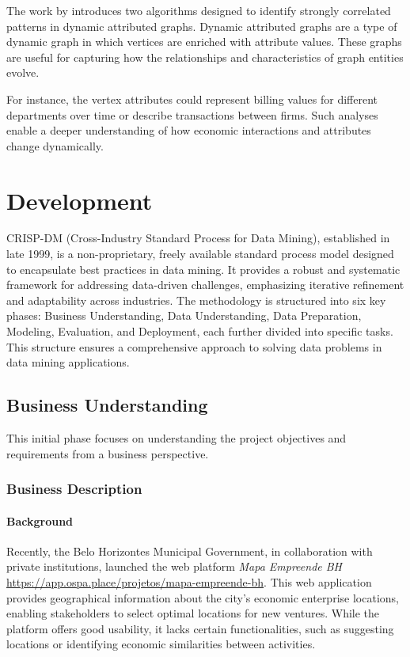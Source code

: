 \documentclass[12pt]{article}
\begin{document}
The work by \cite{fournier2019mining} introduces two algorithms designed to identify strongly correlated patterns in dynamic attributed graphs. Dynamic attributed graphs are a type of dynamic graph in which vertices are enriched with attribute values. These graphs are useful for capturing how the relationships and characteristics of graph entities evolve.

For instance, the vertex attributes could represent billing values for different departments over time or describe transactions between firms. Such analyses enable a deeper understanding of how economic interactions and attributes change dynamically.

\section{Development}
CRISP-DM (Cross-Industry Standard Process for Data Mining), established in late 1999, is a non-proprietary, freely available standard process model designed to encapsulate best practices in data mining. It provides a robust and systematic framework for addressing data-driven challenges, emphasizing iterative refinement and adaptability across industries. The methodology is structured into six key phases: Business Understanding, Data Understanding, Data Preparation, Modeling, Evaluation, and Deployment, each further divided into specific tasks. This structure ensures a comprehensive approach to solving data problems in data mining applications.

\subsection{Business Understanding}
This initial phase focuses on understanding the project objectives and requirements from a business perspective.
\subsubsection{Business Description}

\paragraph{Background}

Recently, the Belo Horizontes Municipal Government, in collaboration with private institutions, launched the web platform \textit{Mapa Empreende BH} \url{https://app.ospa.place/projetos/mapa-empreende-bh}. This web application provides geographical information about the city's economic enterprise locations, enabling stakeholders to select optimal locations for new ventures. While the platform offers good usability, it lacks certain functionalities, such as suggesting locations or identifying economic similarities between activities.
\end{document}
